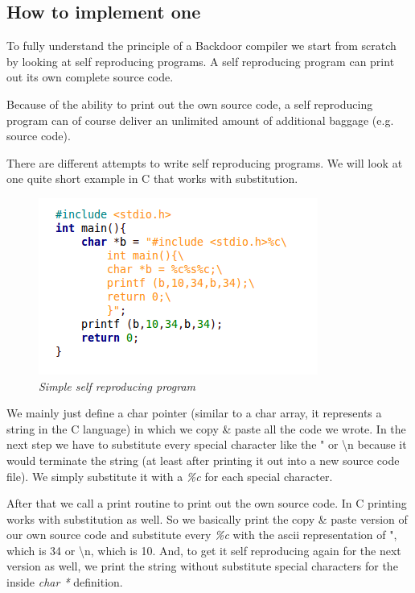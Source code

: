 \documentclass[a4paper, 12pt]{article}
\begin{document}
\newpage

\subsection{How to implement one}

To fully understand the principle of a Backdoor compiler we start from scratch by looking at self reproducing programs. A self reproducing program can print out its own complete source code.

Because of the ability to print out the own source code, a self reproducing program can of course deliver an unlimited amount of additional baggage (e.g. source code).

There are different attempts to write self reproducing programs. We will look at one quite short example in C that works with substitution.

\begin{figure}[h]
\begin{center}
\includegraphics[keepaspectratio=true, scale=0.8]{Simple_Self_Reproducing.png}
\end{center}
\caption{\emph{Simple self reproducing program}}
\end{figure}

We mainly just define a char pointer (similar to a char array, it represents a string in the C language) in which we copy \& paste all the code we wrote. In the next step we have to substitute every special character like the " or \textbackslash n because it would terminate the string (at least after printing it out into a new source code file). We simply substitute it with a \emph{\%c} for each special character.

After that we call a print routine to print out the own source code. In C printing works with substitution as well. So we basically print the copy \& paste version of our own source code and substitute every \emph{\%c} with the ascii representation of ", which is 34 or \textbackslash n, which is 10. And, to get it self reproducing again for the next version as well, we print the string without substitute special characters for the inside \emph{char *} definition.
\end{document}
